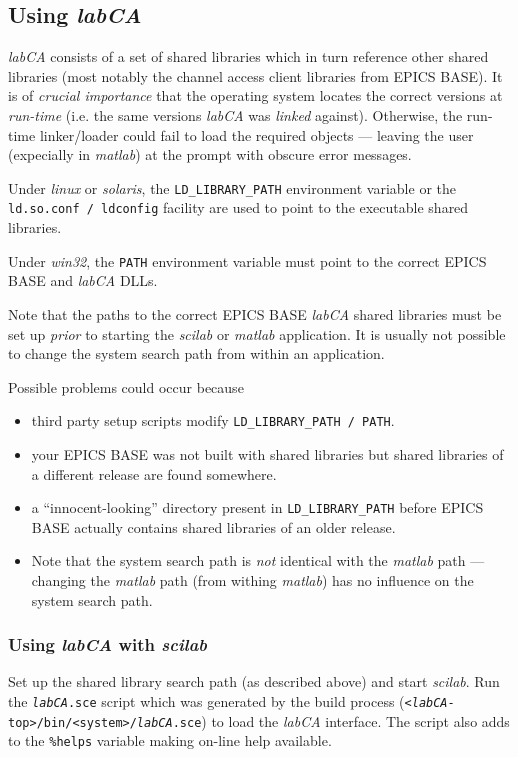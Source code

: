 \documentclass{article}
\newcommand{\sca}{\ita{labCA}}
\newcommand{\scilab}{\ita{scilab}}
\newcommand{\matlab}{\ita{matlab}}
\newcommand{\windoze}{\ita{win32}}
\newcommand{\com}[1]{{\tt #1}}
\newcommand{\ita}[1]{\emph{#1}}
\begin{document}
\subsection{Using \sca{}}
\sca{} consists of a set of shared libraries which in turn reference
other shared libraries (most notably the channel access client libraries
from EPICS BASE). It is of \ita{crucial importance} that the operating
system locates the correct versions at \ita{run-time} (i.e. the same versions
\sca{} was \ita{linked} against). Otherwise, the run-time linker/loader
could fail to load the required objects --- leaving the user (expecially
in \matlab) at the prompt with obscure error messages.

Under \ita{linux} or \ita{solaris}, the \com{LD\_LIBRARY\_PATH} environment
variable or the \com{ld.so.conf / ldconfig} facility are used to point
to the executable shared libraries.

Under \windoze{}, the \com{PATH} environment variable must point to the
correct EPICS BASE and \sca{} DLLs.

Note that the paths to the correct EPICS BASE \sca{} shared libraries
must be set up \ita{prior} to starting the \scilab{} or \matlab{} application.
It is usually not possible to change the system search
path from within an application.

Possible problems could occur because
\begin{itemize}
\item third party setup scripts modify \com{LD\_LIBRARY\_PATH / PATH}.
\item your EPICS BASE was not built with shared libraries but shared libraries
of a different release are found somewhere.
\item a ``innocent-looking'' directory present in \com{LD\_LIBRARY\_PATH}
before EPICS BASE actually contains shared libraries of an older release.
\item Note that the system search path is \ita{not} identical with the
\matlab{} path --- changing the \matlab{} path (from withing \matlab)
has no influence on the system search path.
\end{itemize}

\subsubsection{Using \sca{} with \scilab}
Set up the shared library search path (as described above) and start
\scilab. Run the \com{\sca.sce} script which was generated by the build process
(\com{<\sca-top>/bin/<system>/\sca.sce}) to load the \sca{} interface.
The script also adds to the \com{\%helps} variable making on-line
help available.
\end{document}
